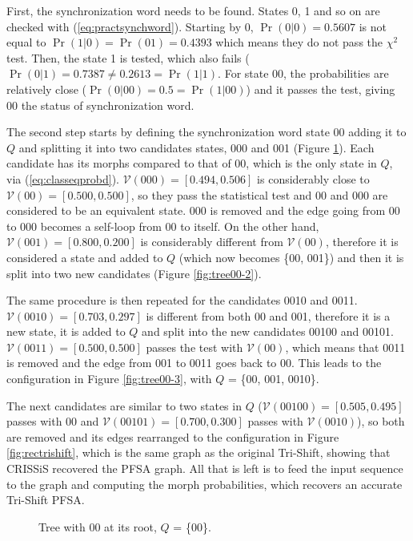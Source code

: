 {First, the synchronization word needs to be found. States 0, 1 and so on are checked with (\ref{eq:practsynchword}). Starting by 0, $\Pr(0|0) = 0.5607$ is not equal to $\Pr(1|0) = \Pr(01)= 0.4393$ which means they do not pass the $\chi^2$ test. Then, the state 1 is tested, which also fails ($\Pr(0|1) = 0.7387 \neq 0.2613 = \Pr(1|1)$. For state 00, the probabilities are relatively close ($\Pr(0|00) = 0.5 = \Pr(1|00)$) and it passes the test, giving 00 the status of synchronization word.

The second step starts by defining the synchronization word state 00 adding it to $Q$ and splitting it into two candidates states, 000 and 001 (Figure \ref{fig:tree00}). Each candidate has its morphs compared to that of 00, which is the only state in $Q$, via (\ref{eq:classeqprobd}). $\mathcal{V}(000) = [0.494, 0.506]$ is considerably close to $\mathcal{V}(00) = [0.500, 0.500]$, so they pass the statistical test and 00 and 000 are considered to be an equivalent state. 000 is removed and the edge going from 00 to 000 becomes a self-loop from 00 to itself. On the other hand, $\mathcal{V}(001) = [0.800, 0.200]$ is considerably different from $\mathcal{V}(00)$, therefore it is considered a state and added to $Q$ (which now becomes \{00, 001\}) and then it is split into two new candidates (Figure \ref{fig:tree00-2}).

The same procedure is then repeated for the candidates 0010 and 0011. $\mathcal{V}(0010) = [0.703, 0.297]$ is different from both 00 and 001, therefore it is a new state, it is added to $Q$ and split into the new candidates 00100 and 00101. $\mathcal{V}(0011) = [0.500, 0.500]$ passes the test with $\mathcal{V}(00)$, which means that 0011 is removed and the edge from 001 to 0011 goes back to 00. This leads to the configuration in Figure \ref{fig:tree00-3}, with $Q$ = \{00, 001, 0010\}.

The next candidates are similar to two states in $Q$ ($\mathcal{V}(00100) = [0.505, 0.495]$ passes with 00 and $\mathcal{V}(00101) = [0.700, 0.300]$ passes with $\mathcal{V}(0010)$), so both are removed and its edges rearranged to the configuration in Figure \ref{fig:rectrishift}, which is the same graph as the original Tri-Shift, showing that CRISSiS recovered the PFSA graph. All that is left is to feed the input sequence to the graph and computing the morph probabilities, which recovers an accurate Tri-Shift PFSA.

\begin{figure}[t]
\centering
{}
\caption{Tree with 00 at its root, $Q$ = \{00\}. \label{fig:tree00}}
\end{figure}

}
